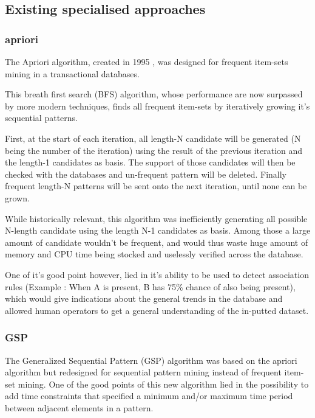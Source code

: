 \documentclass{eplmastersthesis}
\begin{document}
\subsection{Existing specialised approaches}

\subsubsection{apriori}

The Apriori algorithm, created in 1995 \cite{agrawal1995mining}, was designed for frequent item-sets mining in a transactional databases.\newline

This breath first search (BFS) algorithm, whose performance are now surpassed by more modern techniques, finds all frequent item-sets by iteratively growing it's sequential patterns. \newline

First, at the start of each iteration, all length-N candidate will be generated (N being the number of the iteration) using the result of the previous iteration and the length-1 candidates as basis. The support of those candidates will then be checked with the databases and un-frequent pattern will be deleted. Finally frequent length-N patterns will be sent onto the next iteration, until none can be grown. \newline

While historically relevant, this algorithm was inefficiently generating all possible N-length candidate using the length N-1 candidates as basis. Among those a large amount of candidate wouldn't be frequent, and would thus waste huge amount of memory and CPU time being stocked and uselessly verified across the database. \newline

One of it's good point however, lied in it's ability to be used to detect association rules (Example : When A is present, B has 75\% chance of also being present), which would give indications about the general trends in the database and allowed human operators to get a general understanding of the in-putted dataset.

\subsubsection{GSP}

The Generalized Sequential Pattern (GSP) algorithm \cite{srikant1996mining} was based on the apriori algorithm but redesigned for sequential pattern mining instead of frequent item-set mining. One of the good points of this new algorithm lied in the possibility to add time constraints that specified a minimum and/or maximum time period between adjacent elements in a pattern. \newline
\end{document}

